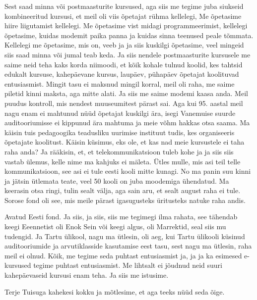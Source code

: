 Sest saad minna või postmaasturite kursused, aga siis me tegime juba siukseid kombineeritud kursusi, et meil oli viis õpetajat rühma kellelegi, Me õpetasime hiire liigutamist kellelegi. Me õpetasime vist midagi programmeerimist, kellelegi õpetasime, kuidas modemit paika panna ja kuidas sinna teenused peale tõmmata. Kellelegi me õpetasime, mis on, veeb ja ja siis kuskilgi õpetasime, veel mingeid siis saad minna või jumal teab keda. Ja siis nendele postmaasturite kursusele me saime neid teha kaks korda niimoodi, et kõik kohale tulnud koolid, kes tahtsid edukalt kursuse, kahepäevane kursus, laupäev, pühapäev õpetajat koolituvad entusiasmist. Mingit tasu ei maksnud mingil korral, meil oli raha, me saime piletid kinni maksta, aga mitte alati. Ja siis me saime modemi kaasa anda. Meil puudus kontroll, mis nendest muuseumitest pärast sai. Aga kui 95. aastal meil nagu enam ei mahtunud nüüd õpetajat kuskilgi ära, isegi Vanemuise suurde auditooriumisse ei kippunud ära mahtuma ja meie võhm hakkas otsa saama. Ma käisin tuis pedagoogika teadusliku uurimise instituut tudis, kes organiseeris õpetajate koolitust. Käisin küsimus, eks ole, et kas nad meie kursustele ei taha raha anda? Ja rääkisin, et, et telekommunikatsioon tuleb kohe ja ja siis siis vastab ülemus, kelle nime ma kahjuks ei mäleta. Ütles mulle, mis asi teil telle kommunikatsioon, see asi ei tule eesti kooli mitte kunagi. No ma panin suu kinni ja jätsin ütlemata teate, veel 50 kooli on juba moodemiga ühendatud. Ma keerasin otsa ringi, tulin sealt välja, aga sain aru, et sealt august raha ei tule. Sorose fond oli see, mis meile pärast igasugusteks üritusteks natuke raha andis. 

Avatud Eesti fond. Ja siis, ja siis, siis me tegimegi ilma rahata, see tähendab keegi Eeennetist oli Enok Sein või keegi algus, oli Marrektid, seal siis mu tudengid. Ja Tartu ülikool, nagu ma ütlesin, oli aeg, kui Tartu ülikooli küsinud auditooriumide ja arvutiklasside kasutamise eest tasu, sest nagu ma ütlesin, raha meil ei olnud. Kõik, me tegime seda puhtast entusiasmist ja, ja ja ka esimesed e-kursused tegime puhtast entusiasmist. Me lihtsalt ei jõudnud neid suuri kahepäevaseid kursusi enam teha. Ja siis me istusime. 

Terje Tuisuga kahekesi kokku ja mõtlesime, et aga teeks nüüd seda õige. 

